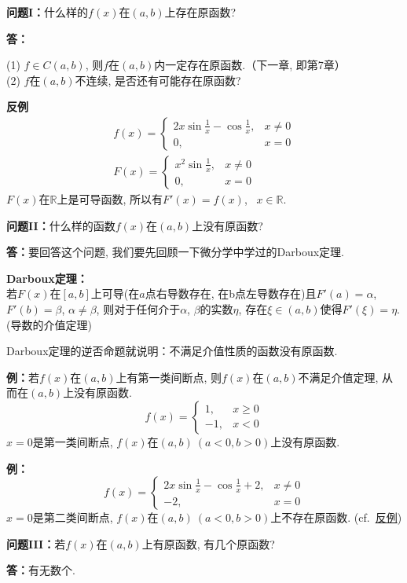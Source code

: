 \documentclass[a4paper,punct=CCT]{ctexbook}
\newcommand*{\hangpar}[2]{\hangindent=1.2cm \textbf{#1}\\[6pt]#2}
\theoremstyle{break}
\let\geq\geqslant
\let\ge\geq}
\begin{document}
\textbf{问题I：}什么样的$f(x)$在$(a,b)$上存在原函数?

\textbf{答：}\parbox[t]{5in}{
(1) $ f \in C(a,b) $, 则$ f $在$(a,b)$内一定存在原函数.（下一章, 即第7章）\\
(2) $f$在$(a,b)$不连续, 是否还有可能存在原函数?}

\hypertarget{E:discontI}{}
\textbf{反例}
\begin{gather*}
	f(x) =
	\begin{cases}
		2x \sin \frac{1}{x} - \cos \frac{1}{x}, & x \ne 0 \\
		0, & x = 0
	\end{cases} \\
	F(x) =
	\begin{cases}
		x^2 \sin \frac{1}{x}, & x \ne 0 \\
		0, & x = 0
	\end{cases}
\end{gather*}
$F(x)$在$\mathbb{R}$上是可导函数, 所以有$F'(x) = f(x)$, \ $x \in \mathbb{R}$.

\textbf{问题II：}什么样的函数$f(x)$在$(a,b)$上没有原函数?

\textbf{答：}要回答这个问题, 我们要先回顾一下微分学中学过的Darboux定理.

\hangpar{Darboux定理：}{
若$F(x)$在$[a,b]$上可导(在$a$点右导数存在, 在b点左导数存在)且$F'(a) = \alpha$,
$F'(b) = \beta$, $\alpha \ne \beta$, 则对于任何介于$\alpha$, $\beta$的实数$\eta$,
存在$\xi \in (a,b) $使得$F'(\xi) = \eta$. (导数的介值定理) }

Darboux定理的逆否命题就说明：不满足介值性质的函数没有原函数.

\textbf{例：}若$f(x)$在$(a,b)$上有第一类间断点, 则$f(x)$在$(a,b)$不满足介值定理,
从而在$(a,b)$上没有原函数.
\[f(x) = \begin{cases}
    1, & x \ge 0 \\
    -1, & x < 0
  \end{cases}\]
$x = 0$是第一类间断点, $f(x)$在$(a,b)\ (a<0, b>0)$上没有原函数.

\textbf{例：}
\[f(x) = \begin{cases}
    2x \sin \frac{1}{x} - \cos \frac{1}{x} + 2, & x \ne 0 \\
    -2, & x = 0
  \end{cases}\]
$x=0$是第二类间断点, $f(x)$在$(a,b)\ (a<0, b>0)$上不存在原函数. (cf.~\hyperlink{E:discontI}{反例})

\textbf{问题III：}若$f(x)$在$(a,b)$上有原函数, 有几个原函数?

\textbf{答：}有无数个.
\end{document}
